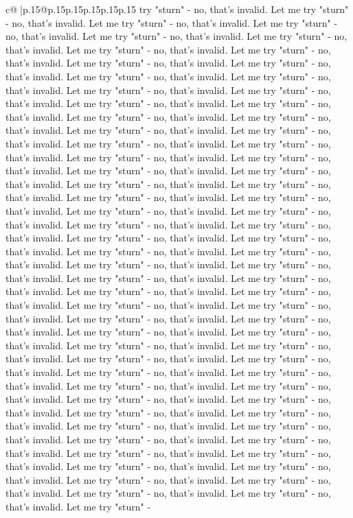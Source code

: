 \documentclass{article}
\begin{document}
{\begin{supertabular}{c@{$\;$}|p{.15\linewidth}@{}p{.15\linewidth}p{.15\linewidth}p{.15\linewidth}p{.15\linewidth}p{.15\linewidth}}
{{{try "sturn" {-} no, that's invalid. Let me try "sturn" {-} no, that's invalid. Let me try "sturn" {-} no, that's invalid. Let me try "sturn" {-} no, that's invalid. Let me try "sturn" {-} no, that's invalid. Let me try "sturn" {-} no, that's invalid. Let me try "sturn" {-} no, that's invalid. Let me try "sturn" {-} no, that's invalid. Let me try "sturn" {-} no, that's invalid. Let me try "sturn" {-} no, that's invalid. Let me try "sturn" {-} no, that's invalid. Let me try "sturn" {-} no, that's invalid. Let me try "sturn" {-} no, that's invalid. Let me try "sturn" {-} no, that's invalid. Let me try "sturn" {-} no, that's invalid. Let me try "sturn" {-} no, that's invalid. Let me try "sturn" {-} no, that's invalid. Let me try "sturn" {-} no, that's invalid. Let me try "sturn" {-} no, that's invalid. Let me try "sturn" {-} no, that's invalid. Let me try "sturn" {-} no, that's invalid. Let me try "sturn" {-} no, that's invalid. Let me try "sturn" {-} no, that's invalid. Let me try "sturn" {-} no, that's invalid. Let me try "sturn" {-} no, that's invalid. Let me try "sturn" {-} no, that's invalid. Let me try "sturn" {-} no, that's invalid. Let me try "sturn" {-} no, that's invalid. Let me try "sturn" {-} no, that's invalid. Let me try "sturn" {-} no, that's invalid. Let me try "sturn" {-} no, that's invalid. Let me try "sturn" {-} no, that's invalid. Let me try "sturn" {-} no, that's invalid. Let me try "sturn" {-} no, that's invalid. Let me try "sturn" {-} no, that's invalid. Let me try "sturn" {-} no, that's invalid. Let me try "sturn" {-} no, that's invalid. Let me try "sturn" {-} no, that's invalid. Let me try "sturn" {-} no, that's invalid. Let me try "sturn" {-} no, that's invalid. Let me try "sturn" {-} no, that's invalid. Let me try "sturn" {-} no, that's invalid. Let me try "sturn" {-} no, that's invalid. Let me try "sturn" {-} no, that's invalid. Let me try "sturn" {-} no, that's invalid. Let me try "sturn" {-} no, that's invalid. Let me try "sturn" {-} no, that's invalid. Let me try "sturn" {-} no, that's invalid. Let me try "sturn" {-} no, that's invalid. Let me try "sturn" {-} no, that's invalid. Let me try "sturn" {-} no, that's invalid. Let me try "sturn" {-} no, that's invalid. Let me try "sturn" {-} no, that's invalid. Let me try "sturn" {-} no, that's invalid. Let me try "sturn" {-} no, that's invalid. Let me try "sturn" {-} no, that's invalid. Let me try "sturn" {-} no, that's invalid. Let me try "sturn" {-} no, that's invalid. Let me try "sturn" {-} no, that's invalid. Let me try "sturn" {-} no, that's invalid. Let me try "sturn" {-} no, that's invalid. Let me try "sturn" {-} no, that's invalid. Let me try "sturn" {-} no, that's invalid. Let me try "sturn" {-} no, that's invalid. Let me try "sturn" {-} no, that's invalid. Let me try "sturn" {-} no, that's invalid. Let me try "sturn" {-} no, that's invalid. Let me try "sturn" {-} no, that's invalid. Let me try "sturn" {-} no, that's invalid. Let me try "sturn" {-} no, that's invalid. Let me try "sturn" {-} no, that's invalid. Let me try "sturn" {-} no, that's invalid. Let me try "sturn" {-} no, that's invalid. Let me try "sturn" {-} no, that's invalid. Let me try "sturn" {-} }}}
\end{supertabular}}
\end{document}
